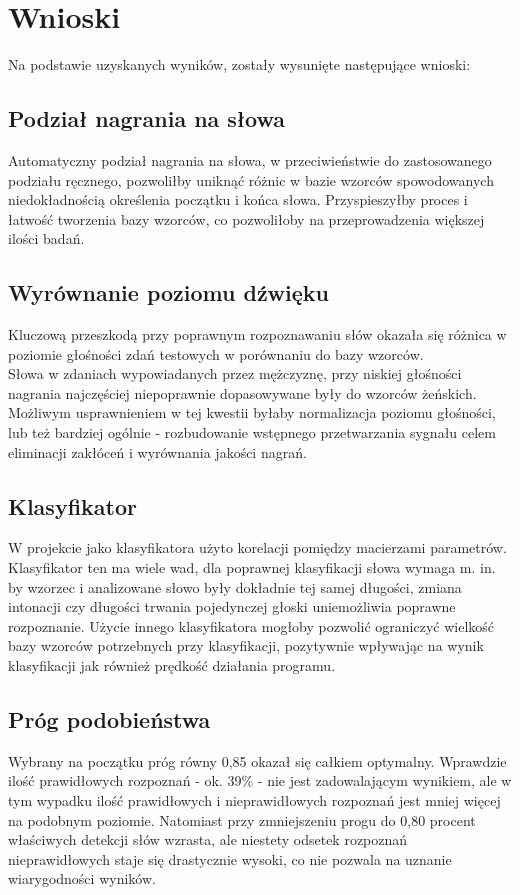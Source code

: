 \section{Wnioski}

Na podstawie uzyskanych wyników, zostały wysunięte następujące wnioski:

\subsection{Podział nagrania na słowa}
Automatyczny podział nagrania na słowa, w przeciwieństwie do zastosowanego podziału ręcznego, pozwoliłby uniknąć różnic w bazie wzorców spowodowanych niedokładnością określenia początku i końca słowa. Przyspieszyłby proces i łatwość tworzenia bazy wzorców, co pozwoliłoby na przeprowadzenia większej ilości badań.

\subsection{Wyrównanie poziomu dźwięku}
Kluczową przeszkodą przy poprawnym rozpoznawaniu słów okazała się różnica w poziomie głośności zdań testowych w porównaniu do bazy wzorców. \\
Słowa w zdaniach wypowiadanych przez mężczyznę, przy niskiej głośności nagrania najczęściej niepoprawnie dopasowywane były do wzorców żeńskich. \\
Możliwym usprawnieniem w tej kwestii byłaby normalizacja poziomu głośności, lub też bardziej ogólnie - rozbudowanie wstępnego przetwarzania sygnału celem eliminacji zakłóceń i wyrównania jakości nagrań.


\subsection{Klasyfikator}
W projekcie jako klasyfikatora użyto korelacji pomiędzy macierzami parametrów. Klasyfikator ten ma wiele wad, dla poprawnej klasyfikacji słowa wymaga m. in. by wzorzec i analizowane słowo były dokładnie tej samej długości, zmiana intonacji czy długości trwania pojedynczej głoski uniemożliwia poprawne rozpoznanie. Użycie innego klasyfikatora mogłoby pozwolić ograniczyć wielkość bazy wzorców potrzebnych przy klasyfikacji, pozytywnie wpływając na wynik klasyfikacji jak również prędkość działania programu.

\subsection{Próg podobieństwa}

Wybrany na początku próg równy 0,85 okazał się całkiem optymalny. Wprawdzie ilość prawidłowych rozpoznań - ok. 39\% - nie jest zadowalającym wynikiem, ale w tym wypadku ilość prawidłowych i nieprawidłowych rozpoznań jest mniej więcej na podobnym poziomie. Natomiast przy zmniejszeniu progu do 0,80 procent właściwych detekcji słów wzrasta, ale niestety odsetek rozpoznań nieprawidłowych staje się drastycznie wysoki, co nie pozwala na uznanie wiarygodności wyników.